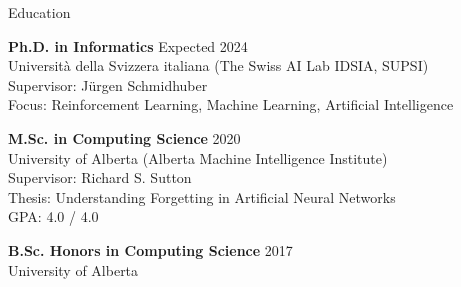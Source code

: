 \documentclass{cv}
\begin{document}

\begin{rSection}{Education}

{\bf Ph.D. in Informatics} \hfill Expected 2024 \vspace{0.05em}\\
Universit{\`{a}} della Svizzera italiana (The Swiss AI Lab IDSIA, SUPSI) \vspace{0.05em}\\
Supervisor: J{\"u}rgen Schmidhuber \vspace{0.05em}\\
Focus: Reinforcement Learning, Machine Learning, Artificial Intelligence


{\bf M.Sc. in Computing Science} \hfill 2020 \vspace{0.05em}\\
University of Alberta (Alberta Machine Intelligence Institute) \vspace{0.05em}\\
Supervisor: Richard S. Sutton \vspace{0.05em}\\
Thesis: Understanding Forgetting in Artificial Neural Networks \vspace{0.05em}\\
GPA: 4.0 / 4.0


{\bf B.Sc. Honors in Computing Science} \hfill 2017 \vspace{0.05em}\\
University of Alberta

\end{rSection}

\end{document}
